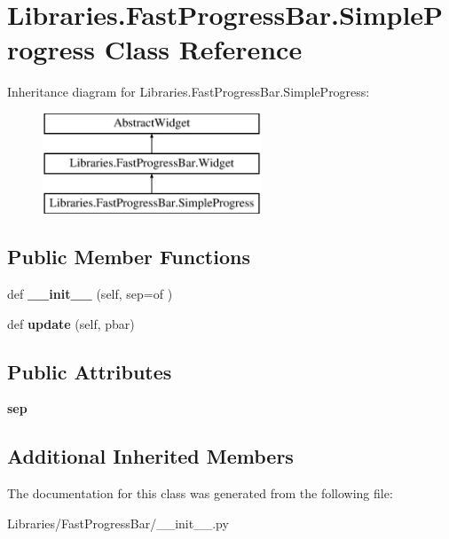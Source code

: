 \hypertarget{class_libraries_1_1_fast_progress_bar_1_1_simple_progress}{}\section{Libraries.\+Fast\+Progress\+Bar.\+Simple\+Progress Class Reference}
\label{class_libraries_1_1_fast_progress_bar_1_1_simple_progress}
Inheritance diagram for Libraries.\+Fast\+Progress\+Bar.\+Simple\+Progress\+:\begin{figure}[H]
\begin{center}
\leavevmode
\includegraphics[height=3.000000cm]{class_libraries_1_1_fast_progress_bar_1_1_simple_progress}
\end{center}
\end{figure}
\subsection*{Public Member Functions}
\begin{DoxyCompactItemize}
\item 
def {\bfseries \+\_\+\+\_\+init\+\_\+\+\_\+} (self, sep=\textquotesingle{}of \textquotesingle{})\hypertarget{class_libraries_1_1_fast_progress_bar_1_1_simple_progress_a200d7d7f8c0255f7d3b128f7377b67d4}{}\label{class_libraries_1_1_fast_progress_bar_1_1_simple_progress_a200d7d7f8c0255f7d3b128f7377b67d4}

\item 
def {\bfseries update} (self, pbar)\hypertarget{class_libraries_1_1_fast_progress_bar_1_1_simple_progress_a1207a43deb37cf685a34dd3cddcfa39f}{}\label{class_libraries_1_1_fast_progress_bar_1_1_simple_progress_a1207a43deb37cf685a34dd3cddcfa39f}

\end{DoxyCompactItemize}
\subsection*{Public Attributes}
\begin{DoxyCompactItemize}
\item 
{\bfseries sep}\hypertarget{class_libraries_1_1_fast_progress_bar_1_1_simple_progress_a2a1fe677b78ade6841390c01889e44a0}{}\label{class_libraries_1_1_fast_progress_bar_1_1_simple_progress_a2a1fe677b78ade6841390c01889e44a0}

\end{DoxyCompactItemize}
\subsection*{Additional Inherited Members}


The documentation for this class was generated from the following file\+:\begin{DoxyCompactItemize}
\item 
Libraries/\+Fast\+Progress\+Bar/\+\_\+\+\_\+init\+\_\+\+\_\+.\+py\end{DoxyCompactItemize}
